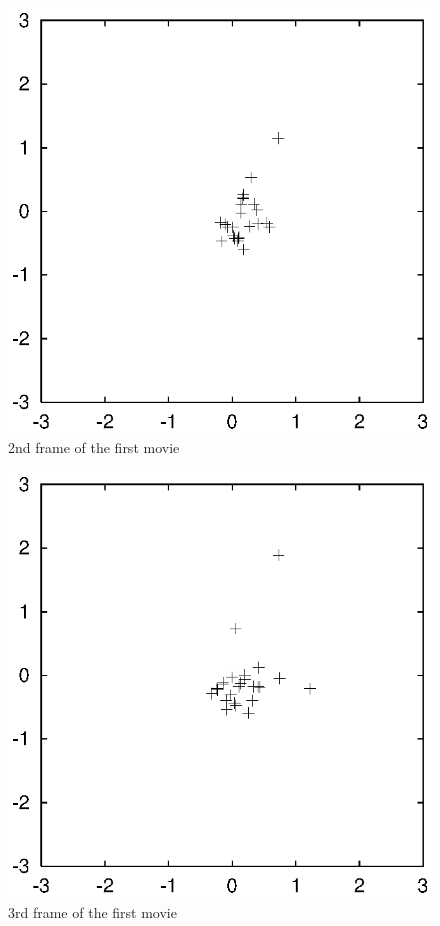 \begin{figure}[htb]
\centering
\includegraphics[width=4.5in]{chap10/movietmp_nbody1.out.1.ps}
\caption[2nd frame of movie \#1]
{2nd frame of the first movie}
\label{fig:movie1.2}
\end{figure}

\begin{figure}[htb]
\centering
\includegraphics[width=4.5in]{chap10/movietmp_nbody1.out.2.ps}
\caption[3rd frame of movie \#1]
{3rd frame of the first movie}
\label{fig:movie1.3}
\end{figure}

